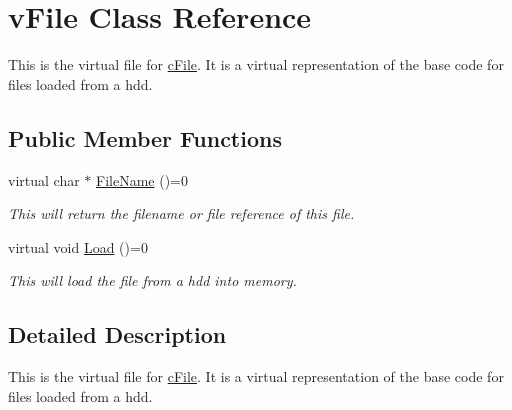 \hypertarget{classv_file}{
\section{vFile Class Reference}
\label{classv_file}
}


This is the virtual file for \hyperlink{classc_file}{cFile}. It is a virtual representation of the base code for files loaded from a hdd.  


\subsection*{Public Member Functions}
\begin{DoxyCompactItemize}
\item 
\hypertarget{classv_file_a34a809462f9074a0b82a913f3c9bd955}{
virtual char $\ast$ \hyperlink{classv_file_a34a809462f9074a0b82a913f3c9bd955}{FileName} ()=0}
\label{classv_file_a34a809462f9074a0b82a913f3c9bd955}

\begin{DoxyCompactList}\small\item\em This will return the filename or file reference of this file. \end{DoxyCompactList}\item 
\hypertarget{classv_file_a7478cc6459dfe5c11bcf55555f652f3d}{
virtual void \hyperlink{classv_file_a7478cc6459dfe5c11bcf55555f652f3d}{Load} ()=0}
\label{classv_file_a7478cc6459dfe5c11bcf55555f652f3d}

\begin{DoxyCompactList}\small\item\em This will load the file from a hdd into memory. \end{DoxyCompactList}\end{DoxyCompactItemize}


\subsection{Detailed Description}
This is the virtual file for \hyperlink{classc_file}{cFile}. It is a virtual representation of the base code for files loaded from a hdd. 